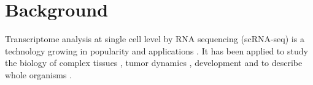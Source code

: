 \documentclass{bmcart}
\begin{document}
\begin{frontmatter}
\begin{abstractbox}

\begin{keyword}
\end{keyword}


\end{abstractbox}
%

\end{frontmatter}



\section*{Background}
Transcriptome analysis at single cell level by RNA sequencing (scRNA-seq) is a technology growing in popularity and applications \cite{svensson_2018}. It has been applied to study the biology of complex tissues \cite{guo_2018, ventotormo_2018}, tumor dynamics \cite{rozenblattrosen_2020, tirosh_2016, patel_2014, neftel_2019}, development \cite{rosenberg_2018, wagner_2018} and to describe whole organisms \cite{plass_2018, regev_2017}.
\end{document}
